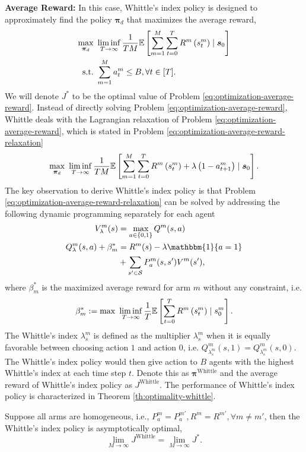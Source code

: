\textbf{Average Reward:} In this case, Whittle's index policy is designed to approximately find the policy $\bm{\pi}_d$ that maximizes the average reward,
\begin{align}
    \max_{\bm{\pi}_d}~&\liminf_{T\to\infty}\frac{1}{TM}\mathbb{E}\left[\sum_{m=1}^M\sum_{t=0}^TR^m\left(s_t^m\right)\mid\bm{s}_0
    \right]\notag\\
    \text{s.t.~}&\sum_{m=1}^M a_t^m\leq B,\forall t\in[T]\label{eq:optimization-average-reward}.
\end{align}
We will denote $J^*$ to be the optimal value of Problem \ref{eq:optimization-average-reward}. Instead of directly solving Problem \ref{eq:optimization-average-reward}, Whittle deals with the Lagrangian relaxation of Problem \ref{eq:optimization-average-reward}, which is stated in Problem \ref{eq:optimization-average-reward-relaxation}
\begin{equation}
    \max_{\bm{\pi}_d}~\liminf_{T\to\infty}\frac{1}{TM}\mathbb{E}\left[\sum_{m=1}^M\sum_{t=0}^TR^m\left(s_t^m\right)+\lambda\left(1-a_{t+1}^m\right)\mid\bm{s}_0
    \right].\label{eq:optimization-average-reward-relaxation}
\end{equation}
The key observation to derive Whittle's index policy is that Problem \ref{eq:optimization-average-reward-relaxation} can be solved by addressing the following dynamic programming separately for each agent
\begin{align*}
    V^m_\lambda(s)&=\max_{a\in\{0,1\}} Q^m(s,a)\\
    Q^m_\lambda(s,a)+\beta^*_m&=R^m(s)-\lambda\mathbbm{1}\{a=1\}\\&+\sum_{s'\in\mathcal{S}}P^m_a(s,s')V^m(s'),
\end{align*}
where $\beta^*_m$ is the maximized average reward for arm $m$ without any constraint, i.e.
\begin{equation*}
    \beta^*_m:=\max~ \liminf_{T\to\infty}\frac{1}{T}\mathbb{E}\left[\sum_{t=0}^TR^m\left(s_t^m\right)\mid s_0^m
    \right].
\end{equation*}
The Whittle's index $\lambda^m_s$ is defined as the multiplier $\lambda_s^m$ when it is equally favorable between choosing action $1$ and action $0$, i.e. $Q^m_{\lambda^m_s}(s,1)=Q^m_{\lambda^m_s}(s,0)$. The Whittle's index policy would then give action to $B$ agents with the highest Whittle's index at each time step $t$. Denote this as $\bm{\pi}^{\text{Whittle}}$ and the average reward of Whittle's index policy as $J^{\text{Whittle}}$. The performance of Whittle's index policy is characterized in Theorem \ref{th:optimality-whittle}.
\begin{theorem}\label{th:optimality-whittle}
Suppose all arms are homogeneous, i.e., $P_a^m=P_a^{m'}, R^m=R^{m'},\forall m\neq m'$, then the Whittle's index policy is asymptotically optimal,
\begin{equation*}
    \lim_{M\to\infty}J^{\text{Whittle}}=\lim_{M\to\infty}J^*.
\end{equation*}
\end{theorem}

